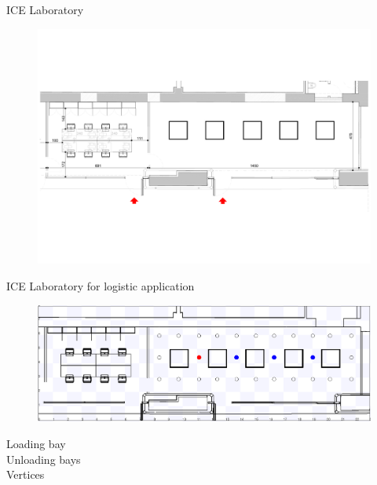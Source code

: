     \begin{frame}[fragile]{ICE Laboratory}
        \begin{figure}[hbt]
            \centering
            \includegraphics[width=\textwidth]{img/model1}
        \end{figure}
    \end{frame}

    \begin{frame}[fragile]{ICE Laboratory for logistic application}
        \begin{figure}[hbt]
            \centering
            \includegraphics[width=\textwidth]{img/labgrafo}
        \end{figure}

        {\color{red}{$\bullet$}}  Loading bay
        \\
        {\color{blue}{$\bullet$}}  Unloading bays
        \\
        {\color{black}{$\circ$}}  Vertices
    \end{frame}

